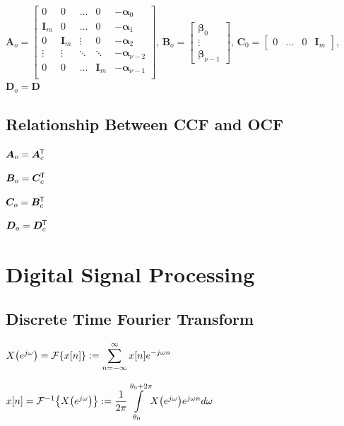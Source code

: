 \documentclass[11pt]{article}
\begin{document}
  \(\bm{A}_o =
  \begin{bmatrix}
    0 & 0 & \dots & 0 & -\bm{\alpha}_0 \\
    \bm{I}_m & 0 & \dots & 0 & -\bm{\alpha}_1 \\
    0 & \bm{I}_m & \vdots & 0 & -\bm{\alpha}_2 \\
    \vdots & \vdots & \ddots & \ddots & -\bm{\alpha}_{\nu - 2} \\
    0 & 0 & \dots & \bm{I}_m & -\bm{\alpha}_{\nu - 1} \\
  \end{bmatrix}\),
  \(\bm{B}_o = \begin{bmatrix} \bm{\beta}_0 \\ \vdots \\ \bm{\beta}_{\nu - 1}\end{bmatrix}\),
  \(\bm{C}_0 =
  \begin{bmatrix}
    0 & \dots & 0 & \bm{I}_m
  \end{bmatrix}\),
  \(\bm{D}_o = \bm{D}\)

  \subsection{Relationship Between CCF and OCF}

  \(\bm{A}_o = \bm{A}_c^{\mkern-1.5mu\mathsf{T}}\)

  \(\bm{B}_o = \bm{C}_c^{\mkern-1.5mu\mathsf{T}}\)

  \(\bm{C}_o = \bm{B}_c^{\mkern-1.5mu\mathsf{T}}\)

  \(\bm{D}_o = \bm{D}_c^{\mkern-1.5mu\mathsf{T}}\)

  \pagebreak

  \section{Digital Signal Processing}

  \subsection{Discrete Time Fourier Transform}
  \begin{multicols}{2}
    \(X{\left( e^{j\omega} \right)} = \mathcal{F}{\left\{ x[n] \right\}} := \displaystyle \sum_{n = -\infty}^{\infty} x[n]e^{-j\omega n}\)

    \columnbreak

    \(x[n] = \mathcal{F}^{-1}{\left\{ X{\left( e^{j\omega} \right)} \right\}} :=
    \dfrac{1}{2\pi}\displaystyle{\int\limits_{\theta_0}^{\theta_0 + 2\pi}} \textstyle
    X{\left( e^{j\omega} \right)}e^{j\omega n} d\omega\)
  \end{multicols}
\end{document}
